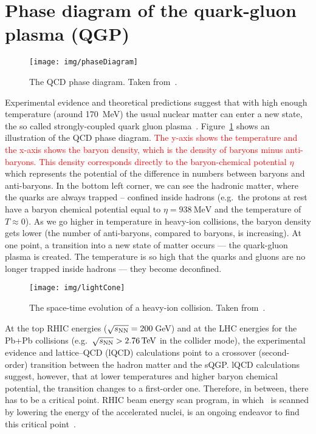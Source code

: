 \section{Phase diagram of the quark-gluon plasma (QGP)}

\begin{figure}[!htb]
\centering
\texttt{[image: img/phaseDiagram]}
\caption[The QCD phase diagram.]{\label{fig:phaseDiagram}The QCD phase diagram. Taken from~\cite{bnlSite}.}
\end{figure}
 

Experimental evidence and theoretical predictions suggest that with high enough temperature (around \SI{170}{\mega\electronvolt}) the usual nuclear matter can enter a new state, the so called strongly-coupled quark gluon plasma~\cite{QGPdiscovered}\@. Figure~\ref{fig:phaseDiagram} shows an illustration of the QCD phase diagram. 
\textcolor{red}{
 The y-axis shows the temperature and the x-axis shows the baryon density, which is the density of baryons minus anti-baryons. This density corresponds directly to the baryon-chemical potential $\eta$ 
}
which represents the potential of the difference in numbers between baryons and anti-baryons. In the bottom left corner, we can see the hadronic matter, where the quarks are always trapped -- confined inside hadrons (e.g.\ the protons at rest have a baryon chemical potential equal to $\eta = \SI{938}{\mega\electronvolt}$ and the temperature of $T \approx 0$). 
As we go higher in temperature in heavy-ion collisions, the baryon density gets lower (the number of anti-baryons, compared to baryons, is increasing). At one point, a transition into a new state of matter occurs --- the quark-gluon plasma is created. The temperature is so high that the quarks and gluons are no longer trapped inside hadrons --- they become deconfined. 

\begin{figure}[!htb]
\centering
\texttt{[image: img/lightCone]}
\caption[The space-time evolution of a heavy-ion collision.]{The space-time evolution of a heavy-ion collision. Taken from~\cite{helen}.}
\label{fig:lightCone}
\end{figure}

At the top RHIC energies ($\sqrt{s_\text{NN}} = 200\,$GeV) and at the LHC energies for the Pb+Pb collisions (e.g.\ $\snn > \SI{2.76}{\tera\electronvolt}$ in the collider mode), the experimental evidence and lattice--QCD (lQCD) calculations point to a crossover (second-order) transition between the hadron matter and the sQGP\@. lQCD calculations suggest, however, that at lower temperatures and higher baryon chemical potential, the transition changes to a first-order one. Therefore, in between, there has to be a critical point. RHIC beam energy scan program, in which \snn\ is scanned by lowering the energy of the accelerated nuclei, is an ongoing endeavor to find this critical point~\cite{BESII}. 


